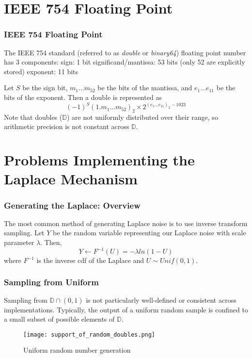 \documentclass{beamer}
\begin{document}
\section{IEEE 754 Floating Point}
\begin{frame}
    \frametitle{IEEE 754 Floating Point}
    The IEEE 754 standard (referred to as \emph{double} or \emph{binary64}) floating point number has 3 components: \newline
    sign: 1 bit \newline
    significand/mantissa: 53 bits (only 52 are explicitly stored) \newline
    exponent: 11 bits

    Let $S$ be the sign bit, $m_{1} \hdots m_{52}$ be the bits of the mantissa, and $e_{1} \hdots e_{11}$ be the bits of the exponent. Then a double is represented as
\[ (-1)^S (1.m_{1} \hdots m_{52})_{2} \times 2^{(e_1 \hdots e_{11})_2 - 1023} \]
    Note that doubles ($\mathbb{D}$) are not uniformly distributed over their range, so arithmetic precision is not constant across $\mathbb{D}$.
\end{frame}

\section{Problems Implementing the Laplace Mechanism}
\begin{frame}
    \frametitle{Generating the Laplace: Overview}
    The most common method of generating Laplace noise is to use inverse transform sampling. Let $Y$ be the random variable representing our Laplace noise with scale parameter $\lambda$. Then,
    \[ Y \leftarrow F^{-1}(U) = -\lambda ln (1-U) \]
    where $F^{-1}$ is the inverse cdf of the Laplace and $U \sim Unif(0,1)$.
\end{frame}

\begin{frame}
    \frametitle{Sampling from Uniform}
    Sampling from $\mathbb{D} \cap (0,1)$ is not particularly well-defined or consistent across implementations. Typically, the output of a uniform random sample is confined to a small subset of possible elements of $\mathbb{D}$. \cite{Mir12}
    \begin{figure}
        \texttt{[image: support\_of\_random\_doubles.png]}
        \caption{Uniform random number generation \cite{Mir12}}
    \end{figure}
\end{frame}
\end{document}
